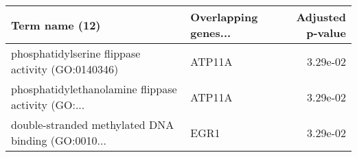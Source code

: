 \begin{tabular}{llr}
\toprule
                                    Term name (12) & Overlapping genes... &  Adjusted p-value \\
\midrule
 phosphatidylserine flippase activity (GO:0140346) &               ATP11A &          3.29e-02 \\
phosphatidylethanolamine flippase activity (GO:... &               ATP11A &          3.29e-02 \\
double-stranded methylated DNA binding (GO:0010... &                 EGR1 &          3.29e-02 \\
\bottomrule
\end{tabular}
